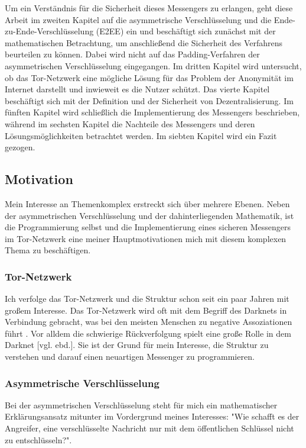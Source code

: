 \documentclass[a4paper,ngerman, headheight=28pt,12pt]{scrartcl}
\newcommand{\vcite}[1]{\cite[vgl.][]{#1}}
\newcommand{\vebd}{[vgl. ebd.]}
\begin{document}
Um ein Verständnis für die Sicherheit dieses Messengers zu erlangen, geht diese Arbeit im zweiten Kapitel auf die asymmetrische Verschlüsselung und die Ende-zu-Ende-Verschlüsselung (E2EE) ein und beschäftigt sich zunächst mit der mathematischen Betrachtung, um anschließend die Sicherheit des Verfahrens beurteilen zu können. Dabei wird nicht auf das Padding-Verfahren der asymmetrischen Verschlüsselung eingegangen. Im dritten Kapitel wird untersucht, ob das Tor-Netzwerk eine mögliche Lösung für das Problem der Anonymität im Internet darstellt und inwieweit es die Nutzer schützt. Das vierte Kapitel beschäftigt sich mit der Definition und der Sicherheit von Dezentralisierung. Im fünften Kapitel wird schließlich die Implementierung des Messengers beschrieben, während im sechsten Kapitel die Nachteile des Messengers und deren Lösungsmöglichkeiten betrachtet werden. Im siebten Kapitel wird ein Fazit gezogen.

\subsection{Motivation}
Mein Interesse an Themenkomplex erstreckt sich über mehrere Ebenen. Neben der asymmetrischen Verschlüsselung und der dahinterliegenden Mathematik, ist die Programmierung selbst und die Implementierung eines sicheren Messengers im Tor-Netzwerk eine meiner Hauptmotivationen mich mit diesem komplexen Thema zu beschäftigen.
\subsubsection{Tor-Netzwerk}
Ich verfolge das Tor-Netzwerk und die Struktur schon seit ein paar Jahren mit großem Interesse. Das Tor-Netzwerk wird oft mit dem Begriff des Darknets in Verbindung gebracht, was bei den meisten Menschen zu negative Assoziationen führt \vcite{BsiTorDarknet}. Vor alldem die schwierige Rückverfolgung spielt eine große Rolle in dem Darknet \vebd. Sie ist der Grund für mein Interesse, die Struktur zu verstehen und darauf einen neuartigen Messenger zu programmieren.

\subsubsection{Asymmetrische Verschlüsselung}
Bei der asymmetrischen Verschlüsselung steht für mich ein mathematischer Erklärungsansatz mitunter im Vordergrund meines Interesses: "Wie schafft es der Angreifer, eine verschlüsselte Nachricht nur mit dem öffentlichen Schlüssel nicht zu entschlüsseln?".
\end{document}
